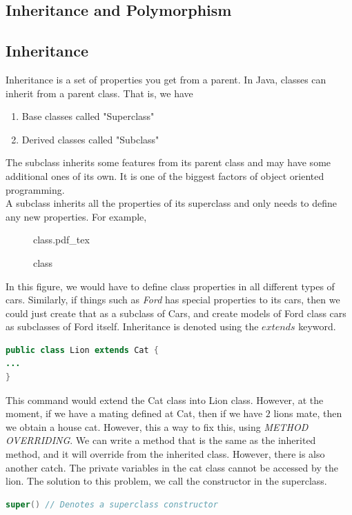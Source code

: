 \documentclass[11pt,a4 paper]{book}
\theoremstyle{plain}
\theoremstyle{definition}
\theoremstyle{remark}
\newcommand{\incfig}[2][1]{%
\def\svgwidth{#1\columnwidth}
{#2.pdf_tex}
}
\begin{document}
\begin{flushleft}
\section{Inheritance and Polymorphism}
\subsection{Inheritance}
Inheritance is a set of properties you get from a parent. In Java, classes can inherit from a parent class. That is, we have
\begin{enumerate}
	\item Base classes called "Superclass" \\
	\item Derived classes called "Subclass"
\end{enumerate}
The subclass inherits some features from its parent class and may have some additional ones of its own. It is one of the biggest factors of object oriented programming. \\
A subclass inherits all the properties of its superclass and only needs to define any new properties. For example,
\begin{figure}[H]
    \centering
    \incfig{class}
    \caption{class}
    \label{fig:class}
\end{figure}
In this figure, we would have to define class properties in all different types of cars. Similarly, if things such as \textit{Ford} has special properties to its cars, then we could just create that as a subclass of Cars, and create models of Ford class cars as subclasses of Ford itself. Inheritance is denoted using the $extends$ keyword.
\begin{lstlisting}[language = Java]
public class Lion extends Cat {
...
}
\end{lstlisting}
This command would extend the Cat class into Lion class. However, at the moment, if we have a mating defined at Cat, then if we have $2$ lions mate, then we obtain a house cat.
However, this a way to fix this, using \textit{METHOD OVERRIDING}. We can write a method that is the same as the inherited method, and it will override from the inherited class. However, there is also another catch. The private variables in the cat class cannot be accessed by the lion. The solution to this problem, we call the constructor in the superclass. 
\begin{lstlisting}[language = Java]
super() // Denotes a superclass constructor


\end{lstlisting}
\end{flushleft}
\end{document}
